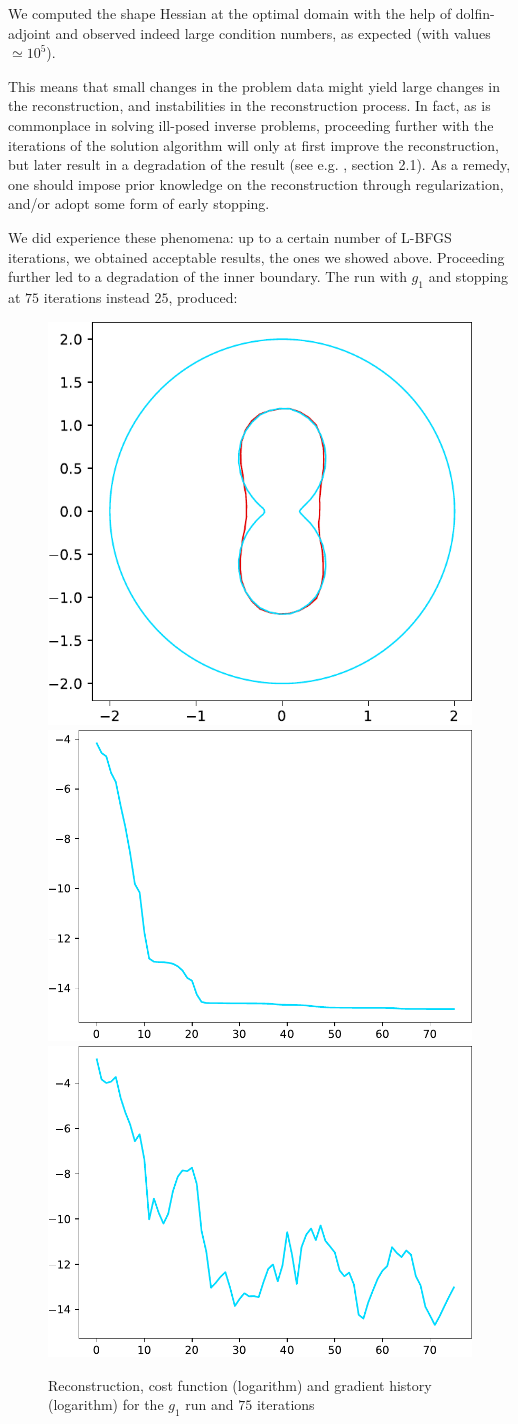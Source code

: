 \documentclass[english,a4paper,9pt,oneside]{scrbook}	%
\theoremstyle{break}
\theoremstyle{remark}
\begin{document}
We computed the shape Hessian at the optimal domain with the help of dolfin-adjoint and observed indeed large condition numbers, as expected (with values $\simeq 10^5$).

This means that small changes in the problem data might yield large changes in the reconstruction, and instabilities in the reconstruction process. In fact, as is commonplace in solving ill-posed inverse problems, proceeding further with the iterations of the solution algorithm will only at first improve the reconstruction, but later result in a degradation of the result (see e.g. \cite{kirsch}, section 2.1). As a remedy, one should impose prior knowledge on the reconstruction through regularization, and/or adopt some form of early stopping.

We did experience these phenomena: up to a certain number of L-BFGS iterations, we obtained acceptable results, the ones we showed above. Proceeding further led to a degradation of the inner boundary. The run with $g_1$ and stopping at $75$ iterations instead $25$, produced:

\begin{figure}[H]
\centering
\includegraphics[height=0.25\columnwidth]{Images/hourglass_constant_degenerate/comparison.pdf}
\includegraphics[height=0.25\columnwidth]{Images/hourglass_constant_degenerate/cost_function.pdf}
\includegraphics[height=0.25\columnwidth]{Images/hourglass_constant_degenerate/gradient_infty_norm.pdf}
\caption{Reconstruction, cost function (logarithm) and gradient history (logarithm) for the $g_1$ run and $75$ iterations}\label{fig:degenerate}
\end{figure}
\end{document}
